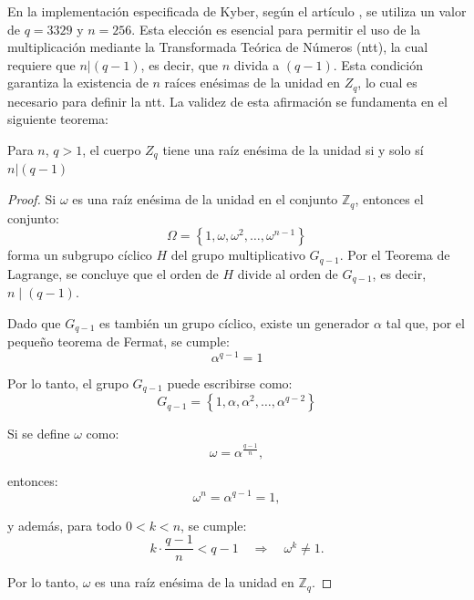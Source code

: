 En la implementación especificada de Kyber, según el artículo \cite{kyber-spec-2021}, se utiliza un valor de \(q=3329\) y \(n=256\). Esta elección es esencial para permitir el uso de la multiplicación mediante la Transformada Teórica de Números (\gls{ntt}), la cual requiere que \(n| (q-1)\), es decir, que \(n\) divida a \((q-1)\). Esta condición garantiza la existencia de \(n\) raíces enésimas de la unidad en \(Z_q\), lo cual es necesario para definir la \gls{ntt}. La validez de esta afirmación se fundamenta en el siguiente teorema\protect\footnotemark[\value{footnote}]:
\newline

\begin{theorem}
	Para \(n\), \(q>1\), el cuerpo  \(Z_q\) tiene una raíz enésima de la unidad si y solo sí \(n| (q-1)\)
\end{theorem} 
\begin{proof}
	Si \(\omega\) es una raíz enésima de la unidad en el conjunto \( \mathbb{Z}_q \), entonces el conjunto:
	\begin{equation}
		\Omega = \left\{1, \omega, \omega^2, \dots, \omega^{n-1} \right\}
	\end{equation}
	forma un subgrupo cíclico \( H \) del grupo multiplicativo \( G_{q-1} \). Por el Teorema de Lagrange, se concluye que el orden de \( H \) divide al orden de \( G_{q-1} \), es decir, \( n \mid (q-1) \).
	\newline
	
	Dado que \( G_{q-1} \) es también un grupo cíclico, existe un generador \(\alpha\) tal que, por el pequeño teorema de Fermat, se cumple:
	\begin{equation}
		\alpha^{q-1} = 1
	\end{equation}
	
	Por lo tanto, el grupo \( G_{q-1} \) puede escribirse como:
	\begin{equation}
		G_{q-1} = \left\{1, \alpha, \alpha^2, \dots, \alpha^{q-2} \right\}
	\end{equation}
	
	Si se define \(\omega\) como:
	\begin{equation}
		\omega = \alpha^{\frac{q-1}{n}},
	\end{equation}
	
	entonces:
	\begin{equation}
		\omega^n = \alpha^{q-1} = 1,
	\end{equation}
	
	y además, para todo \( 0 < k < n \), se cumple:
	\begin{equation}
		k \cdot \frac{q-1}{n} < q-1 \quad \Rightarrow \quad \omega^k \neq 1.
	\end{equation}
	
	Por lo tanto, \(\omega\) es una raíz enésima de la unidad en \(\mathbb{Z}_q\).
\end{proof}
\newpage

